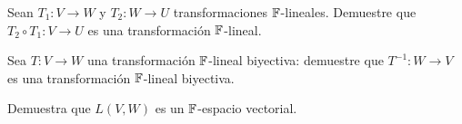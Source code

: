 \begin{exerciselist}
  \item Sean $T_1\colon V \to W$ y $T_2\colon W \to U$ transformaciones $\mathbb{F}$-lineales. Demuestre que $T_2 \circ T_1 \colon V \to U$ es una transformación $\mathbb{F}$-lineal.
  
  \item Sea $T\colon V \to W$ una transformación $\mathbb{F}$-lineal biyectiva: demuestre que $T^{-1}\colon W \to V$ es una transformación $\mathbb{F}$-lineal biyectiva.
  
  \item Demuestra que $L(V,W)$ es un $\mathbb{F}$-espacio vectorial.
\end{exerciselist}